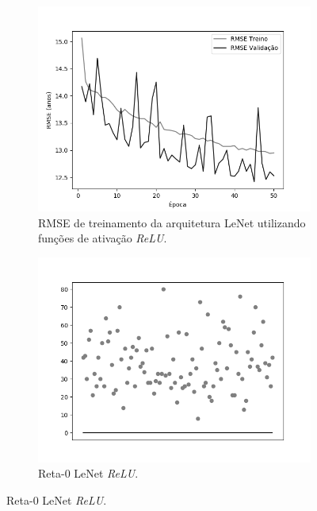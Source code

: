 	\begin{figure}[hb!]
		\caption{Resultados do treinamento e teste da CNN LeNet.}\label{fig:lenet-abordagem1}
		\begin{subfigure}[hb]{0.5\linewidth}
			\caption{RMSE de treinamento da arquitetura LeNet utilizando funções de ativação \emph{ReLU}.}
			\label{fig:redeneuralbiologica}
			\includegraphics[width=\linewidth]{img/graficos/history/lenet/fig-history-image-treat-3-lenet-relu-rmse.png}%
		\end{subfigure}%
		\begin{subfigure}[hb]{0.5\linewidth}
			\caption{Reta-0 LeNet \emph{ReLU}.}
			\label{fig:redeneuralbiologica}
			\includegraphics[width=\linewidth]{img/graficos/reta0/lenet/fig-reta-0-image-treat-3-lenet-relu.png}%

\end{subfigure}
\end{figure}
